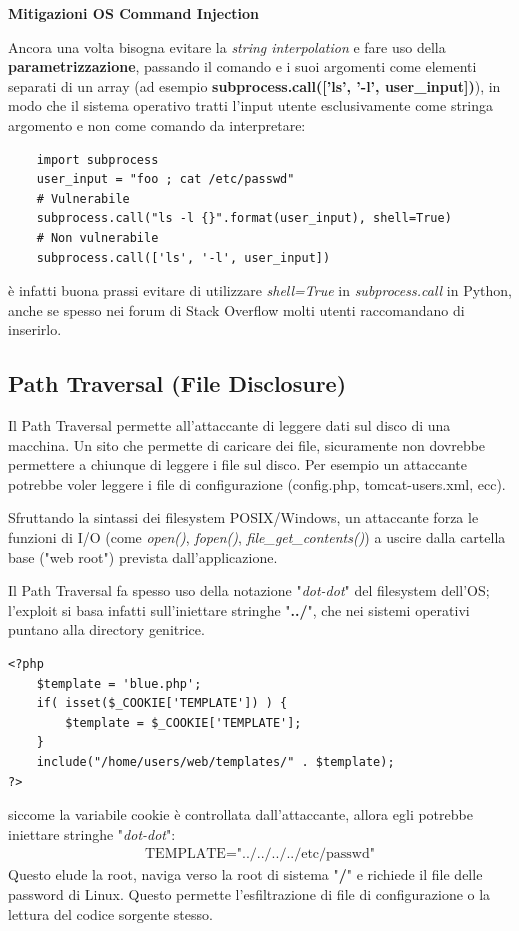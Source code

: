 \textbf{Mitigazioni OS Command Injection}

Ancora una volta bisogna evitare la \textit{string interpolation} e fare uso
della \textbf{parametrizzazione}, passando il comando e i suoi argomenti 
come elementi separati di un array (ad esempio \textbf{subprocess.call(['ls', '-l', user\_input])}),
in modo che il sistema operativo tratti l'input utente esclusivamente come 
stringa argomento e non come comando da interpretare:

\begin{lstlisting}
    import subprocess
    user_input = "foo ; cat /etc/passwd"
    # Vulnerabile
    subprocess.call("ls -l {}".format(user_input), shell=True)
    # Non vulnerabile
    subprocess.call(['ls', '-l', user_input])
\end{lstlisting}
è infatti buona prassi evitare di utilizzare \textit{shell=True} in 
\textit{subprocess.call} in Python, anche se spesso nei forum di 
Stack Overflow molti utenti raccomandano di inserirlo.

\subsection{Path Traversal (File Disclosure)}

Il Path Traversal permette all'attaccante di leggere dati sul disco di una 
macchina. Un sito che permette di caricare dei file, sicuramente non 
dovrebbe permettere a chiunque di leggere i file sul disco. Per esempio 
un attaccante potrebbe voler leggere i file di configurazione 
(config.php, tomcat-users.xml, ecc).

Sfruttando la sintassi dei filesystem POSIX/Windows, un attaccante forza 
le funzioni di I/O (come \textit{open()}, \textit{fopen()}, \textit{file\_get\_contents()}) 
a uscire dalla cartella base ("web root") prevista dall'applicazione.

Il Path Traversal fa spesso uso della notazione "\textit{dot-dot}" del filesystem
dell'OS; l'exploit si basa infatti sull'iniettare stringhe "\textbf{../}", che
nei sistemi operativi puntano alla directory genitrice.

\begin{lstlisting}
<?php
    $template = 'blue.php';
    if( isset($_COOKIE['TEMPLATE']) ) {
        $template = $_COOKIE['TEMPLATE'];
    }
    include("/home/users/web/templates/" . $template);
?>
\end{lstlisting}

siccome la variabile cookie è controllata dall'attaccante, allora egli potrebbe
iniettare stringhe "\textit{dot-dot}":
\begin{gather*}
    \text{TEMPLATE="../../../../etc/passwd"}
\end{gather*}
Questo elude la root, naviga verso la root di sistema "\textbf{/}" e richiede 
il file delle password di Linux. Questo permette l'esfiltrazione di file 
di configurazione o la lettura del codice sorgente stesso.

